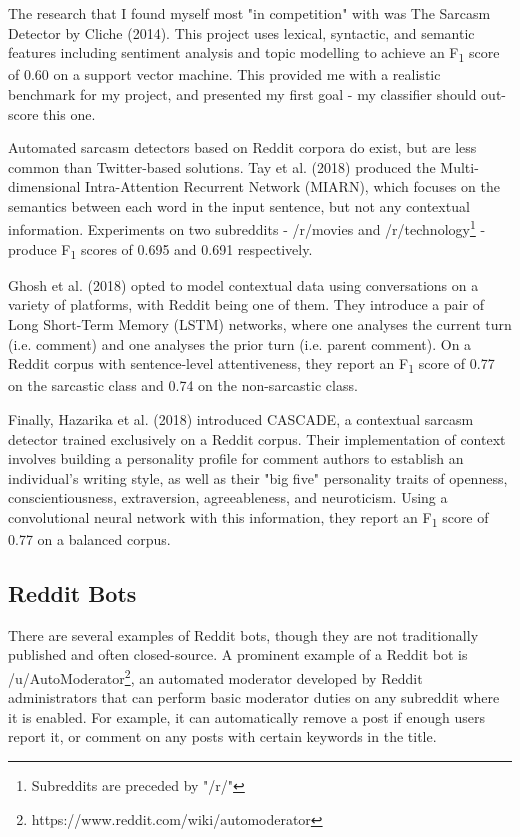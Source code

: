 \documentclass[a4paper,12pt]{article}
\begin{document}
The research that I found myself most "in competition" with was The Sarcasm Detector by Cliche (2014). This project uses lexical, syntactic, and semantic features including sentiment analysis and topic modelling to achieve an F\textsubscript{1} score of 0.60 on a support vector machine. This provided me with a realistic benchmark for my project, and presented my first goal - my classifier should out-score this one.

Automated sarcasm detectors based on Reddit corpora do exist, but are less common than Twitter-based solutions. Tay et al. (2018) produced the Multi-dimensional Intra-Attention Recurrent Network (MIARN), which focuses on the semantics between each word in the input sentence, but not any contextual information. Experiments on two subreddits - /r/movies and /r/technology\footnote{Subreddits are preceded by "/r/"} - produce F\textsubscript{1} scores of 0.695 and 0.691 respectively.

Ghosh et al. (2018) opted to model contextual data using conversations on a variety of platforms, with Reddit being one of them. They introduce a pair of Long Short-Term Memory (LSTM) networks, where one analyses the current turn (i.e. comment) and one analyses the prior turn (i.e. parent comment). On a Reddit corpus with sentence-level attentiveness, they report an F\textsubscript{1} score of 0.77 on the sarcastic class and 0.74 on the non-sarcastic class.

Finally, Hazarika et al. (2018) introduced CASCADE, a contextual sarcasm detector trained exclusively on a Reddit corpus. Their implementation of context involves building a personality profile for comment authors to establish an individual's writing style, as well as their "big five" personality traits of openness, conscientiousness, extraversion, agreeableness, and neuroticism. Using a convolutional neural network with this information, they report an F\textsubscript{1} score of 0.77 on a balanced corpus.

\subsection{Reddit Bots}
There are several examples of Reddit bots, though they are not traditionally published and often closed-source. A prominent example of a Reddit bot is /u/AutoModerator\footnote{https://www.reddit.com/wiki/automoderator}, an automated moderator developed by Reddit administrators that can perform basic moderator duties on any subreddit where it is enabled. For example, it can automatically remove a post if enough users report it, or comment on any posts with certain keywords in the title.
\end{document}
